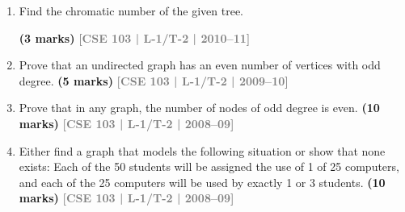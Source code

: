 \documentclass[12pt,a3paper]{article}
\newcommand{\yr}[1]{\hfill\textcolor{gray}{\small\textbf{[#1]}}}
\newcommand{\mk}[1]{\textcolor{orange!70!black}{\small\textbf{(#1 marks)}}}
\begin{document}
\begin{enumerate}
\item Find the chromatic number of the given tree.
\begin{center}
\end{center}

\mk{3} \yr{CSE 103 | L-1/T-2 | 2010--11}


\item Prove that an undirected graph has an even number of vertices with odd degree.
\mk{5} \yr{CSE 103 | L-1/T-2 | 2009--10}

\item Prove that in any graph, the number of nodes of odd degree is even.
\mk{10} \yr{CSE 103 | L-1/T-2 | 2008--09}

\item Either find a graph that models the following situation or show that none exists: Each of the 50 students will be assigned the use of 1 of 25 computers, and each of the 25 computers will be used by exactly 1 or 3 students.
\mk{10} \yr{CSE 103 | L-1/T-2 | 2008--09}


\end{enumerate}
\end{document}
